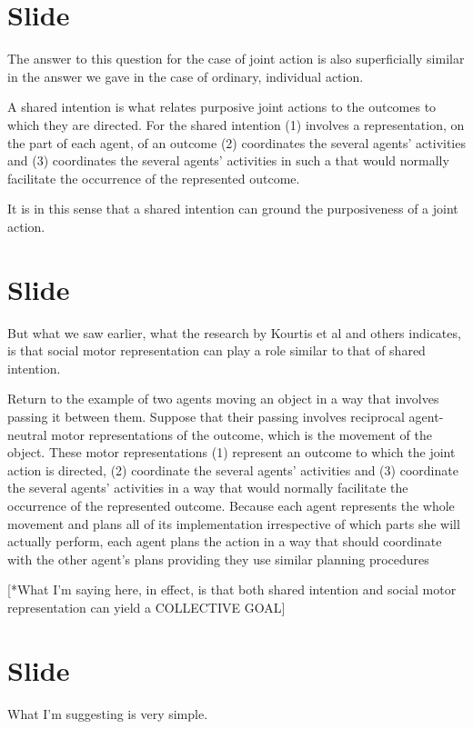 \documentclass[12pt,\papersize]{extarticle}
\begin{document}
\section{Slide}
The answer to this question for the case of joint action is also superficially similar in the answer we gave in the case of ordinary, individual action.

A shared intention is what relates purposive joint actions to the outcomes to which they are directed.
For the shared intention
(1) involves a representation, on the part of each agent, of an outcome
(2) coordinates the several agents’ activities
and 
(3) coordinates the several agents’ activities in such a that would normally facilitate the occurrence of the represented outcome.

It is in this sense that a shared intention can ground the purposiveness of a joint action.




\section{Slide}
But what we saw earlier, what the research by Kourtis et al and others indicates, is that social motor representation can play a  role similar to that of shared intention.

Return to the example of two agents moving an object in a way that involves passing it between them.
Suppose that their passing involves reciprocal agent-neutral motor representations of the outcome, which is the movement of the object. 
These motor representations
(1) represent an outcome to which the joint action is directed,
(2) coordinate the several agents’ activities
and 
(3) coordinate the several agents’ activities in a way that would normally facilitate the occurrence of the represented outcome.
Because each agent represents the whole movement and plans all of its implementation irrespective of which parts she will actually perform, each agent plans the action in a way that should coordinate with the other agent’s plans providing they use similar planning procedures

[*What I’m saying here, in effect, is that both shared intention and social motor representation can yield a COLLECTIVE GOAL]



\section{Slide}
What I’m suggesting is very simple.
\end{document}
